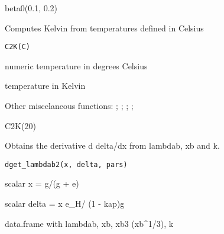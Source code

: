 \documentclass[a4paper]{book}
\begin{document}
%
\begin{Examples}
\begin{ExampleCode}
beta0(0.1, 0.2)
\end{ExampleCode}
\end{Examples}
%
\begin{Description}\relax
Computes Kelvin from temperatures defined in Celsius
\end{Description}
%
\begin{Usage}
\begin{verbatim}
C2K(C)
\end{verbatim}
\end{Usage}
%
\begin{Arguments}
\begin{ldescription}
\item[\code{C}] numeric temperature in degrees Celsius
\end{ldescription}
\end{Arguments}
%
\begin{Value}
temperature in Kelvin
\end{Value}
%
\begin{SeeAlso}\relax
Other miscelaneous functions: ;
; ;
; 
\end{SeeAlso}
%
\begin{Examples}
\begin{ExampleCode}
C2K(20)
\end{ExampleCode}
\end{Examples}
%
\begin{Description}\relax
Obtains the derivative d delta/dx from lambdab, xb and k.
\end{Description}
%
\begin{Usage}
\begin{verbatim}
dget_lambdab2(x, delta, pars)
\end{verbatim}
\end{Usage}
%
\begin{Arguments}
\begin{ldescription}
\item[\code{x}] scalar x = g/(g + e)

\item[\code{delta}] scalar delta = x e\_H/ (1 - kap)g

\item[\code{pars}] data.frame with lambdab, xb, xb3 (xb\textasciicircum{}1/3), k
\end{ldescription}
\end{Arguments}
\end{document}
